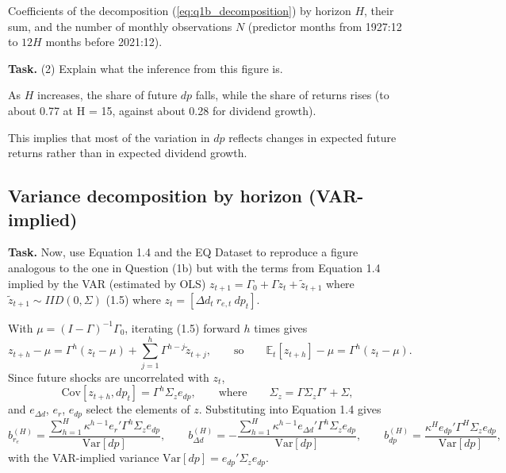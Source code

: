 \documentclass[11pt]{article}
\makeatletter
\newcommand{\E}{\mathbb{E}}
\newcommand{\Var}{\mathrm{Var}}
\newcommand{\Cov}{\mathrm{Cov}}
\newcommand{\dpr}{\mathit{dp}}   %
\newcommand{\task}[1]{\par\if@nobreak\else\needspace{5\baselineskip}\fi\medskip\noindent
  \begin{minipage}{\linewidth}\textbf{Task.} #1\end{minipage}\par   %
  \nopagebreak\medskip\@afterheading}   %
\makeatother
\begin{document}
\begin{table}[H]
  \centering
  
  \caption{Coefficients of the decomposition (\ref{eq:q1b_decomposition}) by horizon $H$, their
  sum, and the number of monthly observations $N$ (predictor months from 1927:12 to $12H$
  months before 2021:12).}
  \label{tab:q1b}
\end{table}

\task{(2) Explain what the inference from this figure is.}

\begin{description}[leftmargin=1.5em, labelindent=0em, itemsep=0.4em]
  \item[Observation.] As $H$ increases, the share of future $\dpr$ falls, while the share
    of returns rises (to about 0.77 at H = 15, against about 0.28 for dividend growth).
  \item[Inference.] This implies that most of the variation in $\dpr$ reflects changes in
    expected future returns rather than in expected dividend growth.
\end{description}

\subsection{Variance decomposition by horizon (VAR-implied)}

\task{Now, use Equation 1.4 and the EQ Dataset to reproduce a figure analogous to the one in
Question (1b) but with the terms from Equation 1.4 implied by the VAR (estimated by OLS)
$z_{t+1} = \Gamma_0 + \Gamma z_t + \tilde z_{t+1}$ where $\tilde z_{t+1} \sim IID(0, \Sigma)$
(1.5) where $z_t = [\Delta d_t \ r_{e,t} \ \dpr_t]$.}

With $\mu = (I - \Gamma)^{-1} \Gamma_0$, iterating (1.5) forward $h$ times gives
\begin{equation}
  z_{t+h} - \mu = \Gamma^{h} (z_t - \mu) + \sum_{j=1}^{h} \Gamma^{h-j} \tilde z_{t+j},
  \qquad \text{so} \qquad
  \E_t[z_{t+h}] - \mu = \Gamma^{h} (z_t - \mu).
  \label{eq:q1c_iterate}
\end{equation}
Since future shocks are uncorrelated with $z_t$,
\begin{equation}
  \Cov[z_{t+h}, \dpr_t] = \Gamma^{h} \Sigma_z e_{dp},
  \qquad \text{where} \qquad
  \Sigma_z = \Gamma \Sigma_z \Gamma' + \Sigma,
  \label{eq:q1c_cov}
\end{equation}
and $e_{\Delta d}$, $e_{r}$, $e_{dp}$ select the elements of $z$. Substituting into
Equation 1.4 gives
\begin{equation}
  b^{(H)}_{r_e} = \frac{\sum_{h=1}^{H} \kappa^{h-1} e_{r}' \Gamma^{h} \Sigma_z e_{dp}}{\Var[\dpr]},
  \qquad
  b^{(H)}_{\Delta d} = -\frac{\sum_{h=1}^{H} \kappa^{h-1} e_{\Delta d}' \Gamma^{h} \Sigma_z e_{dp}}{\Var[\dpr]},
  \qquad
  b^{(H)}_{dp} = \frac{\kappa^{H} e_{dp}' \Gamma^{H} \Sigma_z e_{dp}}{\Var[\dpr]},
  \label{eq:q1c_terms}
\end{equation}
with the VAR-implied variance $\Var[\dpr] = e_{dp}' \Sigma_z e_{dp}$.
\end{document}
